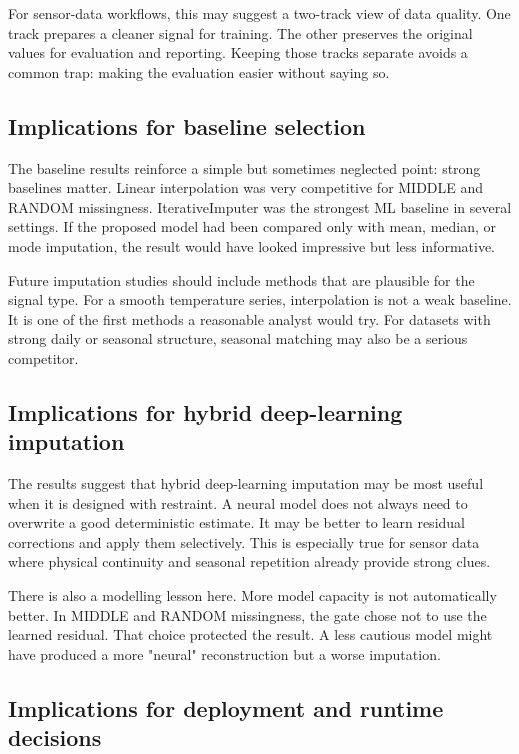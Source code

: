 For sensor-data workflows, this may suggest a two-track view of data quality. One track prepares a cleaner signal for training. The other preserves the original values for evaluation and reporting. Keeping those tracks separate avoids a common trap: making the evaluation easier without saying so.

\subsection{Implications for baseline selection}

The baseline results reinforce a simple but sometimes neglected point: strong baselines matter. Linear interpolation was very competitive for MIDDLE and RANDOM missingness. IterativeImputer was the strongest ML baseline in several settings. If the proposed model had been compared only with mean, median, or mode imputation, the result would have looked impressive but less informative.

Future imputation studies should include methods that are plausible for the signal type. For a smooth temperature series, interpolation is not a weak baseline. It is one of the first methods a reasonable analyst would try. For datasets with strong daily or seasonal structure, seasonal matching may also be a serious competitor.

\subsection{Implications for hybrid deep-learning imputation}

The results suggest that hybrid deep-learning imputation may be most useful when it is designed with restraint. A neural model does not always need to overwrite a good deterministic estimate. It may be better to learn residual corrections and apply them selectively. This is especially true for sensor data where physical continuity and seasonal repetition already provide strong clues.

There is also a modelling lesson here. More model capacity is not automatically better. In MIDDLE and RANDOM missingness, the gate chose not to use the learned residual. That choice protected the result. A less cautious model might have produced a more "neural" reconstruction but a worse imputation.

\subsection{Implications for deployment and runtime decisions}

